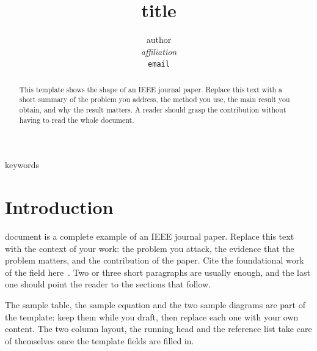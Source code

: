 \documentclass[10pt,journal]{IEEEtran}
\begin{document}
  \title{{{title}}}

  \author{
    {{{author}}}\\
    \textit{{{affiliation}}}\\
    \texttt{{{email}}}
  }

  \maketitle

  \begin{abstract}
    This template shows the shape of an IEEE journal paper. Replace this text
    with a short summary of the problem you address, the method you use, the
    main result you obtain, and why the result matters. A reader should grasp
    the contribution without having to read the whole document.
  \end{abstract}

  \begin{IEEEkeywords}
    {{keywords}}
  \end{IEEEkeywords}

  \section{Introduction}
   document is a complete example of an IEEE journal
  paper. Replace this text with the context of your work: the problem you
  attack, the evidence that the problem matters, and the contribution of the
  paper. Cite the foundational work of the field here~\cite{doe2019}. Two or
  three short paragraphs are usually enough, and the last one should point the
  reader to the sections that follow.

  The sample table, the sample equation and the two sample diagrams are part
  of the template: keep them while you draft, then replace each one with your
  own content. The two column layout, the running head and the reference list
  take care of themselves once the template fields are filled in.
\end{document}
